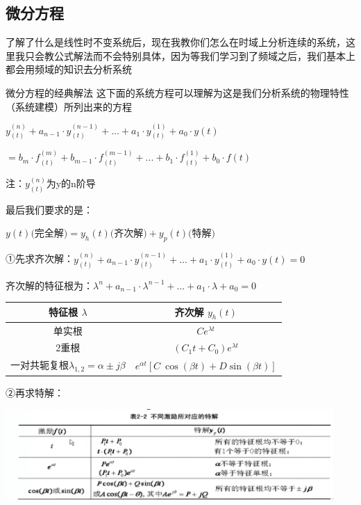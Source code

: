 \documentclass[UTF8,a4paper,12pt]{ctexart}
\begin{document}
  \subsection{微分方程}
  \begin{flushleft}
    了解了什么是线性时不变系统后，现在我教你们怎么在时域上分析连续的系统，这里我只会教公式解法而不会特别具体，因为等我们学习到了频域之后，我们基本上都会用频域的知识去分析系统
  \end{flushleft}
  \begin{titlebox}{微分方程的经典解法}
    这下面的系统方程可以理解为这是我们分析系统的物理特性（系统建模）所列出来的方程
    \par $y^{(n)}_{(t)}+a_{n-1} \cdot y^{(n-1)}_{(t)}+...+a_{1} \cdot y^{(1)}_{(t)}+a_{0} \cdot y{(t)}$
  \par $=b_m \cdot f^{(m)}_{(t)}+b_{m-1} \cdot f^{(m-1)}_{(t)}+...+b_{1} \cdot f^{(1)}_{(t)}+b_{0} \cdot f{(t)}$
    \par  {\scriptsize 注：$y^{(n)}_{(t)}$为y的n阶导}
    \par 最后我们要求的是：
    \par
      $y(t)\text{(完全解)} =y_h(t)\text{(齐次解)}+y_p(t) \text{(特解)}$

  \begin{flushleft}
    \vspace{1cm} 
    ①先求齐次解：$y^{(n)}_{(t)}+a_{n-1} \cdot y^{(n-1)}_{(t)}+...+a_{1} \cdot y^{(1)}_{(t)}+a_{0} \cdot y{(t)}=0$ 
    \par 齐次解的特征根为：$\lambda^n+a_{n-1} \cdot \lambda^{n-1}+...+a_1 \cdot \lambda+a_0=0$ 
  
    \begin{tabular}{cc}
      \toprule
      特征根 $\lambda$ & 齐次解 $y_h(t)$ \\
      \midrule
      单实根 & ${Ce^{\lambda t}}$\\
      2重根 & $\left( C_1t+C_0 \right) e^{\lambda t}$ \\
      一对共轭复根$\lambda_{1,2}=\alpha \pm j\beta $ 
      & 
      $e^{\alpha t}\left[ C\ \cos \left( \beta t \right) +D\sin \left( \beta t \right) \right]$ \\
      \bottomrule
    \end{tabular}
    \par ②再求特解：
  \end{flushleft}
    \includegraphics[width=12.5cm]{picture/a_differential_equation.png}
 
  \end{titlebox}
\end{document}
